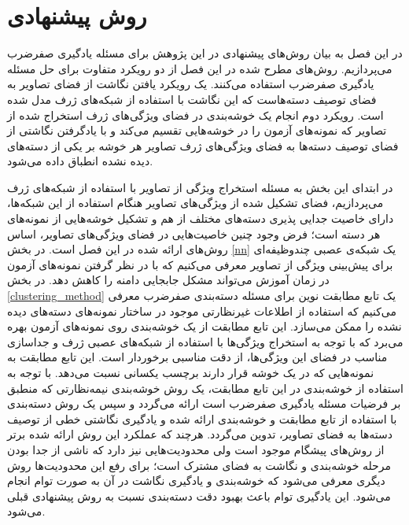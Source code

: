 \chapter{روش پیشنهادی} \label{chap:proposed}
در این فصل به بیان روش‌های پیشنهادی در این پژوهش برای مسئله یادگیری صفرضرب می‌پردازیم. روش‌های مطرح شده در این فصل از دو رویکرد متفاوت برای حل مسئله یادگیری صفرضرب استفاده می‌کنند. یک رویکرد یافتن نگاشت از فضای تصاویر به فضای توصیف دسته‌هاست که این نگاشت با استفاده از شبکه‌های ژرف مدل شده است. رویکرد دوم انجام یک خوشه‌بندی در فضای ویژگی‌های ژرف استخراج شده از تصاویر که نمونه‌های آزمون را در خوشه‌هایی تقسیم می‌کند و با یادگرفتن نگاشتی از فضای توصیف دسته‌ها به فضای ویژگی‌های ژرف تصاویر هر خوشه بر یکی از دسته‌های دیده نشده انطباق داده می‌شود.

در ابتدای این بخش به مسئله استخراج ویژگی از تصاویر با استفاده از شبکه‌های ژرف می‌پردازیم، فضای تشکیل شده از ویژگی‌های تصاویر هنگام استفاده از این شبکه‌ها، دارای خاصیت جدایی پذیری دسته‌های مختلف از هم و تشکیل خوشه‌هایی از نمونه‌های هر دسته است؛ فرض وجود چنین خاصیت‌هایی در فضای ویژگی‌های تصاویر، اساس روش‌های ارائه شده در این فصل است.
در بخش \ref{nn} یک شبکه‌ی عصبی چندوظیفه‌ای برای پیش‌بینی ویژگی از تصاویر معرفی می‌کنیم که با در نظر گرفتن نمونه‌های آزمون در زمان آموزش می‌تواند مشکل جابجایی دامنه را کاهش دهد.
در بخش
\ref{clustering_method}
 یک تابع مطابقت نوین برای مسئله دسته‌بندی صفرضرب معرفی می‌کنیم که استفاده از اطلاعات غیرنظارتی موجود در ساختار نمونه‌های دسته‌های دیده نشده را ممکن می‌سازد. این تابع مطابقت از یک خوشه‌بندی روی نمونه‌های آزمون بهره می‌برد که با توجه به استخراج ویژگی‌ها با استفاده از شبکه‌های عصبی ژرف و جداسازی مناسب در فضای این ویژگی‌ها، از دقت مناسبی برخوردار است. این تابع مطابقت به نمونه‌هایی که در یک خوشه قرار دارند برچسب یکسانی نسبت می‌دهد. با توجه به استفاده از خوشه‌بندی در این تابع مطابقت، یک روش خوشه‌بندی نیمه‌نظارتی که منطبق بر فرضیات مسئله یادگیری صفرضرب است ارائه می‌گردد و سپس یک روش دسته‌بندی با استفاده از تابع مطابقت و خوشه‌بندی ارائه شده و یادگیری نگاشتی خطی از توصیف دسته‌ها به فضای تصاویر، تدوین می‌گردد. هرچند که عملکرد این روش ارائه شده برتر از روش‌های پیشگام موجود است ولی محدودیت‌هایی نیز دارد که ناشی از جدا بودن مرحله خوشه‌بندی و نگاشت به فضای مشترک است؛ برای رفع این محدودیت‌ها روش دیگری معرفی می‌شود که خوشه‌بندی و یادگیری نگاشت در آن به صورت توام انجام می‌شود. این یادگیری توام باعث بهبود دقت دسته‌بندی نسبت به روش پیشنهادی قبلی می‌شود.

